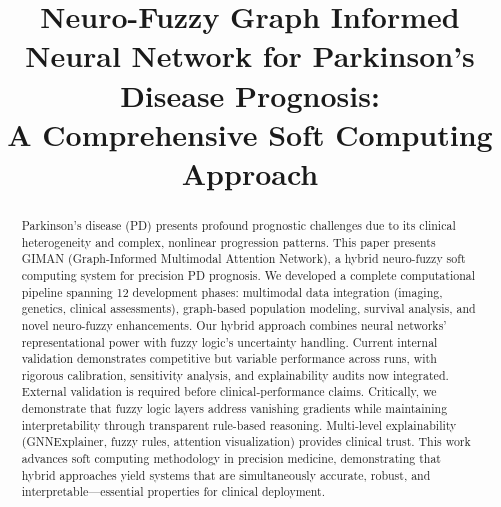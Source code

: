 \documentclass[conference]{IEEEtran}
\begin{document}
\title{Neuro-Fuzzy Graph Informed Neural Network for Parkinson's Disease Prognosis:\\A Comprehensive Soft Computing Approach}

\author{
\and
{}
}

\maketitle

\begin{abstract}
Parkinson's disease (PD) presents profound prognostic challenges due to its clinical heterogeneity and complex, nonlinear progression patterns. This paper presents GIMAN (Graph-Informed Multimodal Attention Network), a hybrid neuro-fuzzy soft computing system for precision PD prognosis. We developed a complete computational pipeline spanning 12 development phases: multimodal data integration (imaging, genetics, clinical assessments), graph-based population modeling, survival analysis, and novel neuro-fuzzy enhancements. Our hybrid approach combines neural networks' representational power with fuzzy logic's uncertainty handling. Current internal validation demonstrates competitive but variable performance across runs, with rigorous calibration, sensitivity analysis, and explainability audits now integrated. External validation is required before clinical-performance claims. Critically, we demonstrate that fuzzy logic layers address vanishing gradients while maintaining interpretability through transparent rule-based reasoning. Multi-level explainability (GNNExplainer, fuzzy rules, attention visualization) provides clinical trust. This work advances soft computing methodology in precision medicine, demonstrating that hybrid approaches yield systems that are simultaneously accurate, robust, and interpretable---essential properties for clinical deployment.
\end{abstract}
\end{document}
